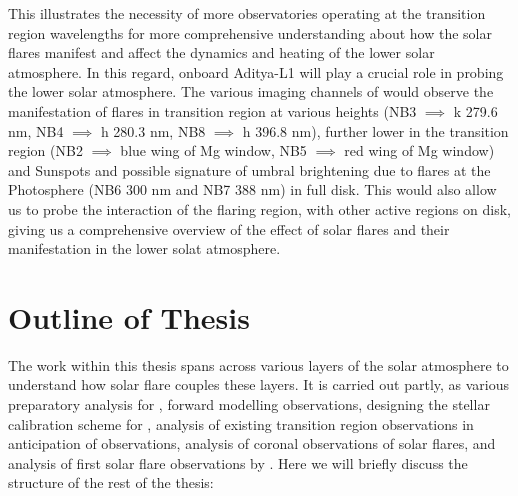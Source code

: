 This illustrates the necessity of more observatories operating at the transition region wavelengths for more comprehensive understanding about how the solar flares manifest and affect the dynamics and heating of the lower solar atmosphere. In this regard, {\suit} onboard Aditya-L1 will play a crucial role in probing the lower solar atmosphere. The various imaging channels of {\suit} would observe the manifestation of flares in transition region at various heights (NB3 $\implies$  k 279.6 nm, NB4 $\implies$  h 280.3 nm, NB8 $\implies$  h 396.8 nm), further lower in the transition region (NB2 $\implies$ blue wing of Mg window, NB5 $\implies$ red wing of Mg window) and Sunspots and possible signature of umbral brightening due to flares at the Photosphere (NB6 300 nm and NB7 388 nm) in full disk. This would also allow us to probe the interaction of the flaring region, with other active regions on disk, giving us a comprehensive overview of the effect of solar flares and their manifestation in the lower solat atmosphere.

\section{Outline of Thesis}\label{sec:outline}

The work within this thesis spans across various layers of the solar atmosphere to understand how solar flare couples these layers. It is carried out partly, as various preparatory analysis for {\suit}, forward modelling {\suit} observations, designing the stellar calibration scheme for {\suit}, analysis of existing transition region observations in anticipation of {\suit} observations, analysis of coronal observations of solar flares, and analysis of first solar flare observations by {\suit}. Here we will briefly discuss the structure of the rest of the thesis:


